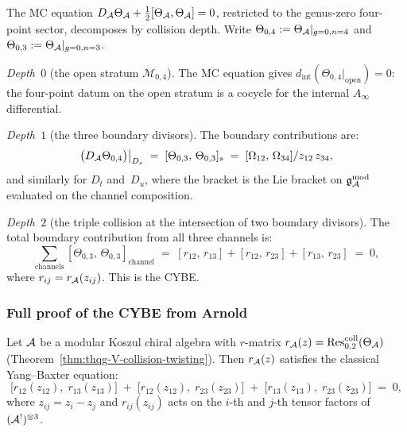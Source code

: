 \begin{construction}
\label{constr:thqg-V-mc-four-points}
The MC equation
$D_{\mathcal{A}}\Theta_{\mathcal{A}} + \tfrac{1}{2}[\Theta_{\mathcal{A}},\Theta_{\mathcal{A}}] = 0$,
restricted to the genus-zero four-point sector, decomposes by
collision depth. Write
$\Theta_{0,4} := \Theta_{\mathcal{A}}|_{g=0,n=4}$ and
$\Theta_{0,3} := \Theta_{\mathcal{A}}|_{g=0,n=3}$.

\emph{Depth~$0$} (the open stratum $\mathcal{M}_{0,4}$).
The MC equation gives
$d_{\mathrm{int}}(\Theta_{0,4}|_{\mathrm{open}}) = 0$:
the four-point datum on the open stratum is a cocycle for the
internal $A_\infty$ differential.

\emph{Depth~$1$} (the three boundary divisors).
The boundary contributions are:
\begin{equation}\label{eq:thqg-V-depth-1-mc}
\bigl(D_{\mathcal{A}}\Theta_{0,4}\bigr)\big|_{D_s}
\;=\;
[\Theta_{0,3},\,\Theta_{0,3}]_s
\;=\;
[\Omega_{12},\,\Omega_{34}]/z_{12}\,z_{34},
\end{equation}
and similarly for $D_t$ and~$D_u$, where the bracket is the
Lie bracket on $\mathfrak{g}_{\mathcal{A}}^{\mathrm{mod}}$ evaluated on the channel composition.

\emph{Depth~$2$} (the triple collision at the intersection of two
boundary divisors).
The total boundary contribution from all three channels is:
\begin{equation}\label{eq:thqg-V-depth-2-mc}
\sum_{\text{channels}}
[\Theta_{0,3},\,\Theta_{0,3}]_{\text{channel}}
\;=\;
[r_{12},\,r_{13}] + [r_{12},\,r_{23}] + [r_{13},\,r_{23}]
\;=\; 0,
\end{equation}
where $r_{ij} = r_{\mathcal{A}}(z_{ij})$. This is the CYBE.
\end{construction}


\subsubsection{Full proof of the CYBE from Arnold}

\begin{theorem}
\label{thm:thqg-V-cybe-from-arnold}
Let $\mathcal{A}$ be a modular Koszul chiral algebra with $r$-matrix
$r_{\mathcal{A}}(z) = \operatorname{Res}^{\mathrm{coll}}_{0,2}(\Theta_{\mathcal{A}})$
\textup{(}Theorem~\textup{\ref{thm:thqg-V-collision-twisting})}.
Then $r_{\mathcal{A}}(z)$ satisfies the classical Yang--Baxter equation:
\begin{equation}\label{eq:thqg-V-cybe}
\bigl[r_{12}(z_{12}),\;r_{13}(z_{13})\bigr]
\;+\;
\bigl[r_{12}(z_{12}),\;r_{23}(z_{23})\bigr]
\;+\;
\bigl[r_{13}(z_{13}),\;r_{23}(z_{23})\bigr]
\;=\; 0,
\end{equation}
where $z_{ij} = z_i - z_j$ and $r_{ij}(z_{ij})$ acts on the
$i$-th and $j$-th tensor factors of
$(\mathcal{A}^!)^{\otimes 3}$.
\end{theorem}

